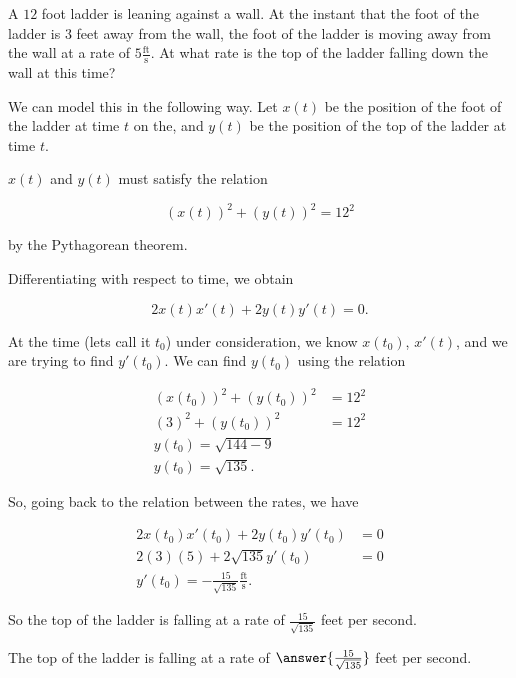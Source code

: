 \documentclass{ximera}
\author{Steven Gubkin}
\begin{document}
\begin{exercise}


A $12$ foot ladder is leaning against a wall.  At the instant that the foot of the ladder is $3$ feet away from the wall, the foot of the ladder is moving away from the wall at a rate of $5 \frac{\textrm{ft}}{\textrm{s}}$.  At what rate is the top of the ladder falling down the wall at this time?

\begin{hint}
We can model this in the following way.  Let $x(t)$ be the position of the foot of the ladder at time $t$ on the, and $y(t)$ be the position of the top of the ladder at time $t$. 
\end{hint}

\begin{hint}
	$x(t)$ and $y(t)$ must satisfy the relation

\[
\left( x(t) \right)^2 + \left( y(t)\right)^2 = 12^2
\]

by the Pythagorean theorem.
\end{hint}

\begin{hint}
	Differentiating with respect to time, we obtain

\[
2x(t)x'(t)+2y(t)y'(t) = 0.
\]
\end{hint}

\begin{hint}
	At the time (lets call it $t_0$) under consideration, we know $x(t_0)$, $x'(t)$, and we are trying to find $y'(t_0)$.  We can find $y(t_0)$ using the relation  

\begin{align*}
	\left( x(t_0) \right)^2 + \left( y(t_0)\right)^2 &= 12^2\\
	\left( 3 \right)^2 + \left( y(t_0)\right)^2 &= 12^2\\
	y(t_0) = \sqrt{144-9}\\
	y(t_0) = \sqrt{135}.
\end{align*}
\end{hint}

\begin{hint}
	So, going back to the relation between the rates, we have

\begin{align*}
2x(t_0)x'(t_0)+2y(t_0)y'(t_0) &= 0\\
2(3)(5)+2\sqrt{135}y'(t_0) &=0\\
y'(t_0) = -\frac{15}{\sqrt{135}}\frac{\textrm{ft}}{\textrm{s}}.
\end{align*}

So the top of the ladder is falling at  a rate of $\frac{15}{\sqrt{135}}$ feet per second.

\end{hint}

\begin{prompt}
	The top of the ladder is falling at a rate of $\answer{\frac{15}{\sqrt{135}}}$ feet per second.
\end{prompt}

\end{exercise}
\end{document}
